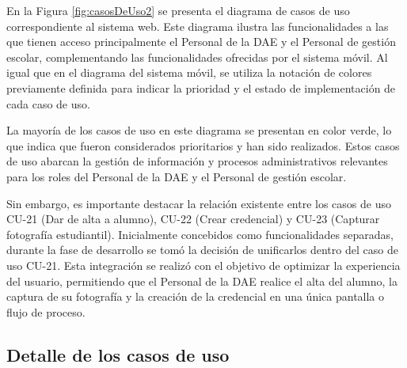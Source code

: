 En la Figura \ref{fig:casosDeUso2} se presenta el diagrama de casos de uso correspondiente al sistema web. Este diagrama ilustra las funcionalidades a las que tienen acceso principalmente el Personal de la DAE y el Personal de gestión escolar, complementando las funcionalidades ofrecidas por el sistema móvil. Al igual que en el diagrama del sistema móvil, se utiliza la notación de colores previamente definida para indicar la prioridad y el estado de implementación de cada caso de uso.

La mayoría de los casos de uso en este diagrama se presentan en color verde, lo que indica que fueron considerados prioritarios y han sido realizados. Estos casos de uso abarcan la gestión de información y procesos administrativos relevantes para los roles del Personal de la DAE y el Personal de gestión escolar.

Sin embargo, es importante destacar la relación existente entre los casos de uso CU-21 (Dar de alta a alumno), CU-22 (Crear credencial) y CU-23 (Capturar fotografía estudiantil). Inicialmente concebidos como funcionalidades separadas, durante la fase de desarrollo se tomó la decisión de unificarlos dentro del caso de uso CU-21. Esta integración se realizó con el objetivo de optimizar la experiencia del usuario, permitiendo que el Personal de la DAE realice el alta del alumno, la captura de su fotografía y la creación de la credencial en una única pantalla o flujo de proceso. 

\subsection{Detalle de los casos de uso}



\newpage


\newpage

%

%


\newpage


\newpage


\newpage


\newpage


\newpage

%


\newpage

